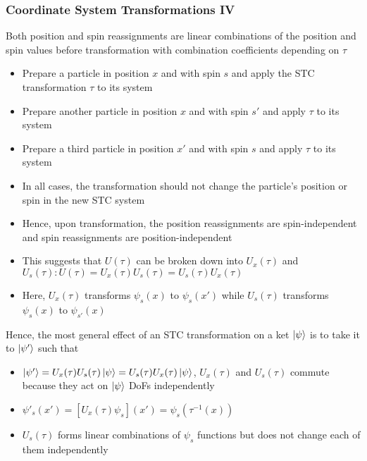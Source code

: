\documentclass[8pt,t,mathserif,aspectratio=169]{beamer}
\begin{document}
\begin{frame}
  \frametitle{Coordinate System Transformations IV}
  \vspace{1mm}
  Both position and spin reassignments are linear combinations of the position and spin values before transformation with combination coefficients depending on $\tau$
  \begin{itemize}
    \item Prepare a particle in position $x$ and with spin $s$ and apply the STC transformation $\tau$ to its system
    \item Prepare another particle in position $x$ and with spin $s'$ and apply $\tau$ to its system
    \item Prepare a third particle in position $x'$ and with spin $s$ and apply $\tau$ to its system
    \item In all cases, the transformation should not change the particle's position or spin in the new STC system
    \item Hence, upon transformation, the position reassignments are spin-independent and spin reassignments are position-independent
    \item This suggests that $U(\tau)$ can be broken down into $U_x(\tau)$ and $U_s(\tau) : U(\tau) = U_x(\tau) U_s(\tau) = U_s(\tau) U_x(\tau)$
    \item Here, $U_x(\tau)$ transforms $\psi_s(x)$ to $\psi_s(x')$ while $U_s(\tau)$ transforms $\psi_s(x)$ to $\psi_{s'}(x)$ 
  \end{itemize}
  Hence, the most general effect of an STC transformation on a ket $\ket{\psi}$ is to take it to $\ket{\psi'}$ such that
  \begin{itemize}
    \item $\ket{\psi'} = U_x(\tau) U_s(\tau) \ket{\psi} = U_s(\tau) U_x(\tau) \ket{\psi}$, $U_x(\tau)$ and $U_s(\tau)$ commute because they act on $\ket{\psi}$ DoFs independently 
    \item $\psi'_s(x') = [U_x(\tau) \psi_s](x') = \psi_s(\tau^{-1}(x))$
    \item $U_s(\tau)$ forms linear combinations of $\psi_s$ functions but does not change each of them independently
  \end{itemize}
\end{frame}
\end{document}
